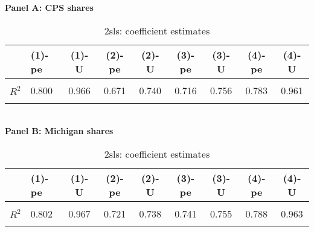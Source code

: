\begin{table}[!htbp] \centering
\caption{2sls: coefficient estimates}
\label{tab:models}
\textbf{Panel A: CPS shares} \\ 
\begin{tabular}[t]{>{}llccccccc}
\toprule
  & (1)-pe & (1)-U & (2)-pe & (2)-U & (3)-pe & (3)-U & (4)-pe & (4)-U\\
\midrule
\textbf{\cellcolor{gray!10}{Coef.}} & \cellcolor{gray!10}{0.435} & \cellcolor{gray!10}{0.531} & \cellcolor{gray!10}{1.347} & \cellcolor{gray!10}{0.510} & \cellcolor{gray!10}{1.496} & \cellcolor{gray!10}{0.440} & \cellcolor{gray!10}{0.259} & \cellcolor{gray!10}{0.742}\\
\textbf{$R^2$} & 0.800 & 0.966 & 0.671 & 0.740 & 0.716 & 0.756 & 0.783 & 0.961\\
\textbf{\cellcolor{gray!10}{F (1st stage)}} & \cellcolor{gray!10}{18.159} & \cellcolor{gray!10}{253.585} & \cellcolor{gray!10}{360.049} & \cellcolor{gray!10}{315.376} & \cellcolor{gray!10}{459.411} & \cellcolor{gray!10}{225.318} & \cellcolor{gray!10}{8.002} & \cellcolor{gray!10}{808.616}\\
\bottomrule
\end{tabular} \vspace{5mm} 
\\ \textbf{Panel B: Michigan shares} \\ 
\begin{tabular}[t]{>{}llccccccc}
\toprule
  & (1)-pe & (1)-U & (2)-pe & (2)-U & (3)-pe & (3)-U & (4)-pe & (4)-U\\
\midrule
\textbf{\cellcolor{gray!10}{Coef.}} & \cellcolor{gray!10}{0.243} & \cellcolor{gray!10}{0.579} & \cellcolor{gray!10}{0.753} & \cellcolor{gray!10}{0.514} & \cellcolor{gray!10}{0.744} & \cellcolor{gray!10}{0.446} & \cellcolor{gray!10}{0.228} & \cellcolor{gray!10}{0.779}\\
\textbf{$R^2$} & 0.802 & 0.967 & 0.721 & 0.738 & 0.741 & 0.755 & 0.788 & 0.963\\
\textbf{\cellcolor{gray!10}{F (1st stage)}} & \cellcolor{gray!10}{25.532} & \cellcolor{gray!10}{296.293} & \cellcolor{gray!10}{549.088} & \cellcolor{gray!10}{305.673} & \cellcolor{gray!10}{570.632} & \cellcolor{gray!10}{218.610} & \cellcolor{gray!10}{22.876} & \cellcolor{gray!10}{907.186}\\
\bottomrule
\end{tabular}\end{table}

